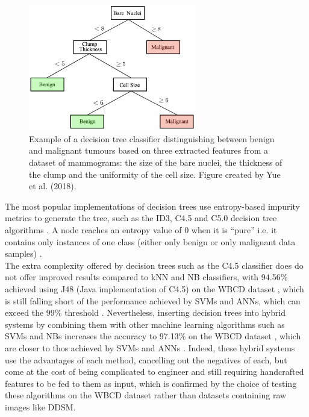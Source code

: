 \begin{figure}[ht]
\centerline{\includegraphics[width=0.65\textwidth]{figures/litsurvey/dt.png}}
\caption{\label{fig:litsurvey-dt-example}Example of a decision tree classifier distinguishing between benign and malignant tumours based on three extracted features from a dataset of mammograms: the size of the bare nuclei, the thickness of the clump and the uniformity of the cell size. Figure created by Yue et al. (2018).}
\end{figure}

The most popular implementations of decision trees use entropy-based impurity metrics to generate the tree, such as the ID3, C4.5 and C5.0 decision tree algorithms \citep{Yue2018}. A node reaches an entropy value of 0 when it is ``pure'' i.e. it contains only instances of one class (either only benign or only malignant data samples) \citep{Geron2019}.\\

The extra complexity offered by decision trees such as the C4.5 classifier does do not offer improved results compared to kNN and NB classifiers, with 94.56\% achieved using J48 (Java implementation of C4.5) on the WBCD dataset \citep{Sumbaly2014}, which is still falling short of the performance achieved by SVMs and ANNs, which can exceed the 99\% threshold \citep{Yue2018}. Nevertheless, inserting decision trees into hybrid systems by combining them with other machine learning algorithms such as SVMs and NBs increases the accuracy to 97.13\% on the WBCD dataset \citep{Kumar2017}, which are closer to thos achieved by SVMs and ANNs \citep{Yue2018}. Indeed, these hybrid systems use the advantages of each method, cancelling out the negatives of each, but come at the cost of being complicated to engineer and still requiring handcrafted features to be fed to them as input, which is confirmed by the choice of testing these algorithms on the WBCD dataset rather than datasets containing raw images like DDSM.

